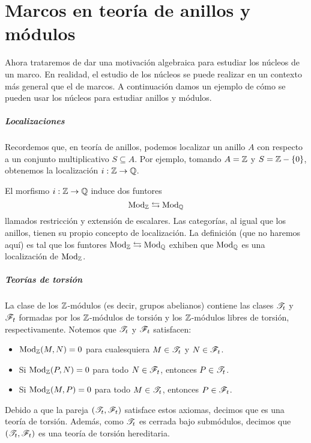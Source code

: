 \chapter{Marcos en teoría de anillos y módulos}

Ahora trataremos de dar una motivación algebraica para
estudiar los núcleos de un marco.
En realidad, el estudio de los núcleos se puede realizar
en un contexto más general que el de marcos.
A continuación damos un ejemplo de cómo se pueden usar
los núcleos para estudiar anillos y módulos.

\paragraph{Localizaciones}
Recordemos que, en teoría de anillos,
podemos localizar un anillo $A$ con respecto a un conjunto
multiplicativo $S\subseteq A$.
Por ejemplo, tomando $A=\mathbb Z$ y $S=\mathbb Z-\{0\}$,
obtenemos la localización $i:\mathbb Z\to\mathbb Q$.

El morfismo $i:\mathbb Z\to\mathbb Q$ induce dos funtores
\[
    \mathrm{Mod}_\mathbb Z\leftrightarrows\mathrm{Mod}_\mathbb Q
\]
llamados restricción y extensión de escalares.
Las categorías, al igual que los anillos,
tienen su propio concepto de localización.
La definición (que no haremos aquí) es tal que
los funtores $\mathrm{Mod}_\mathbb Z\leftrightarrows\mathrm{Mod}_\mathbb Q$
exhiben que $\mathrm{Mod}_\mathbb Q$ es una localización de $\mathrm{Mod}_\mathbb Z$.

\paragraph{Teorías de torsión}
La clase de los $\mathbb Z$-módulos (es decir, grupos abelianos)
contiene las clases $\mathscr{T}_t$ y $\mathscr{F}_t$
formadas por los $\mathbb Z$-módulos de torsión y los $\mathbb Z$-módulos
libres de torsión, respectivamente.
Notemos que $\mathscr{T}_t$ y $\mathscr{F}_t$ satisfacen:
\begin{itemize}
    \item
    $\mathrm{Mod}_\mathbb Z(M,N)=0$ para cualesquiera $M\in\mathscr{T}_t$
    y $N\in\mathscr{F}_t$.
    \item
    Si $\mathrm{Mod}_\mathbb Z(P,N)=0$ para todo $N\in\mathscr{F}_t$,
    entonces $P\in\mathscr{T}_t$.
    \item
    Si $\mathrm{Mod}_\mathbb Z(M,P)=0$ para todo $M\in\mathscr{T}_t$,
    entonces $P\in\mathscr{F}_t$.
\end{itemize}
Debido a que la pareja $(\mathscr{T}_t,\mathscr{F}_t)$ satisface estos
axiomas, decimos que es una teoría de torsión.
Además, como $\mathscr{T}_t$ es cerrada bajo submódulos,
decimos que $(\mathscr{T}_t,\mathscr{F}_t)$ es una teoría de torsión hereditaria.

